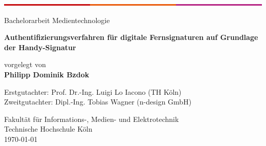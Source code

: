 \begin{titlepage}
    \begin{center}
        \includegraphics[width=\textwidth]{Abbildungen/headline_th}
        \vspace*{1cm}
 
        \LARGE
        Bachelorarbeit Medientechnologie

        \vspace{0.5cm}

        \Huge
        \textbf{Authentifizierungsverfahren für digitale Fernsignaturen auf Grundlage der Handy-Signatur}
 
        \vspace{1.5cm}
        
        \Large
        vorgelegt von \\
        \textbf{Philipp Dominik Bzdok}
 
        \vfill
 
        Erstgutachter: Prof. Dr.-Ing. Luigi Lo Iacono (TH Köln) \\
        Zweitgutachter: Dipl.-Ing. Tobias Wagner (n-design GmbH)
 
        \vspace{0.8cm}
  
        \Large
        Fakultät für Informations-, Medien- und Elektrotechnik  \\
        Technische Hochschule Köln\\

        \monthyeardate\today
 
    \end{center}
\end{titlepage}